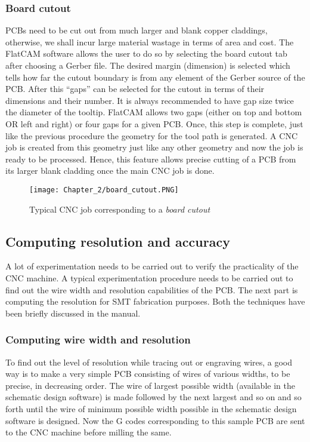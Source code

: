\subsubsection*{Board cutout}

PCBs need to be cut out from much larger and blank copper claddings, otherwise, we shall incur large material wastage in terms of area and cost. The FlatCAM software allows the user to do so by selecting the board cutout tab after choosing a Gerber file. The desired margin (dimension) is selected which tells how far the cutout boundary is from any element of the Gerber source of the PCB. After this “gaps” can be selected for the cutout in terms of their dimensions and their number. It is always recommended to have gap size twice the diameter of the tooltip. FlatCAM allows two gaps (either on top and bottom OR left and right) or four gaps for a given PCB. Once, this step is complete, just like the previous procedure the geometry for the tool path is generated. A CNC job is created from this geometry just like any other geometry and now the job is ready to be processed.  Hence, this feature allows precise cutting of a PCB from its larger blank cladding once the main CNC job is done.

\begin{figure}[h]
 \centering
 \texttt{[image: Chapter\_2/board\_cutout.PNG]}
 \caption{Typical CNC job corresponding to a \textit{board cutout}}
 \label{fig:board_cutout}
\end{figure}


\subsection{Computing resolution and accuracy}
A lot of experimentation needs to be carried out to verify the practicality of the CNC machine. A typical experimentation procedure needs to be carried out to find out the wire width and resolution capabilities of the PCB. The next part is computing the resolution for SMT fabrication purposes. Both the techniques have been briefly discussed in the manual.

\subsubsection*{Computing wire width and resolution}
To find out the level of resolution while tracing out or engraving wires, a good way is to make a very simple PCB consisting of wires of various widths, to be precise, in decreasing order. The wire of largest possible width (available in the schematic design software) is made followed by the next largest and so on and so forth until the wire of minimum possible width possible in the schematic design software is designed. Now the G codes corresponding to this sample PCB are sent to the CNC machine before milling the same. \par

